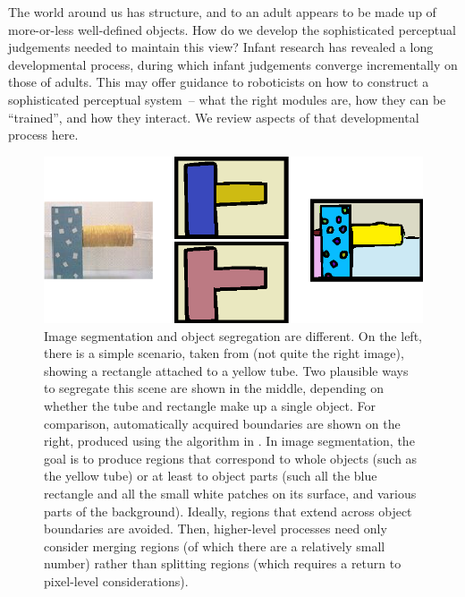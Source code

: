 The world around us has structure, and to an adult appears to be made
up of more-or-less well-defined objects.  How do we develop the
sophisticated perceptual judgements needed to maintain this view?
Infant research has revealed a long developmental process, during
which infant judgements converge incrementally on those of adults.
This may offer guidance to roboticists on how to construct a
sophisticated perceptual system~-- what the right modules are, how
they can be ``trained'', and how they interact.  We review aspects 
of that developmental process here.



\begin{figure}

\centerline{\includegraphics[width=0.75\columnwidth]{fig-seg}}

\caption{
%
Image segmentation and object segregation are different.  On the left,
there is a simple scenario, taken from 
(not quite the right image),
showing a rectangle attached to a yellow tube.  Two 
plausible ways to segregate this scene are shown in the middle,
depending on whether the tube and rectangle make up a single 
object.
For
comparison, automatically acquired boundaries are shown on the right,
produced using the algorithm in
. 
In image segmentation, the goal is to
produce regions that correspond to whole objects (such as the yellow
tube) or at least to object parts (such all the blue rectangle and all
the small white patches on its surface, and various parts of the
background).  Ideally, regions that extend across object boundaries
are avoided.  Then, higher-level processes need only consider merging
regions (of which there are a relatively small number) rather than
splitting regions (which requires a return to pixel-level
considerations).  
%
%
}

\label{fig:image-segmentation}

\end{figure}


